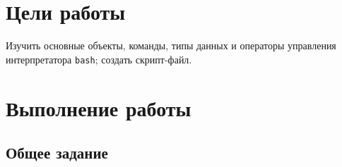\section{Цели работы}
\label{sec:target}

Изучить основные объекты, команды, типы данных и операторы управления интерпретатора \lstinline{bash}; создать скрипт-файл.

\section{Выполнение работы}
\label{sec:job} 
\subsection{Общее задание}
\label{sec:job:general_task}

